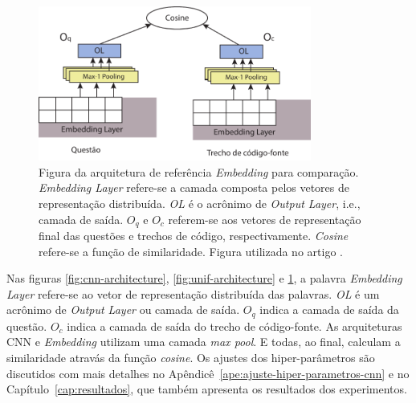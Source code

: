 \begin{figure}[h]
    \centering
    \includegraphics[width=0.8\textwidth]{figuras/cap-experimento/embedding-architecture.pdf}
    \caption{Figura da arquitetura de referência \textit{Embedding} para comparação. \emph{Embedding Layer} refere-se a camada composta pelos vetores de representação distribuída. \emph{OL} é o acrônimo de \emph{Output Layer}, i.e., camada de saída. $O_{q}$ e $O_{c}$ referem-se aos vetores de representação final das questões e trechos de código, respectivamente. \emph{Cosine} refere-se a função de similaridade. Figura utilizada no artigo \cite{marcelo-vem-2019}.}
    \label{fig:embedding-architecture}
\end{figure}
Nas figuras \ref{fig:cnn-architecture}, \ref{fig:unif-architecture} e \ref{fig:embedding-architecture}, a palavra \textit{Embedding Layer} refere-se ao vetor de representação distribuída das palavras. \emph{OL} é um acrônimo de \textit{Output Layer} ou camada de saída. $O_{q}$ indica a camada de saída da questão. $O_{c}$ indica a camada de saída do trecho de código-fonte. As arquiteturas CNN e \textit{Embedding} utilizam uma camada \textit{max pool}. E todas, ao final, calculam a similaridade atravás da função \textit{cosine}. Os ajustes dos hiper-parâmetros são discutidos com mais detalhes no Apêndicê~\ref{ape:ajuste-hiper-parametros-cnn} e no Capítulo~\ref{cap:resultados}, que também apresenta os resultados dos experimentos.

